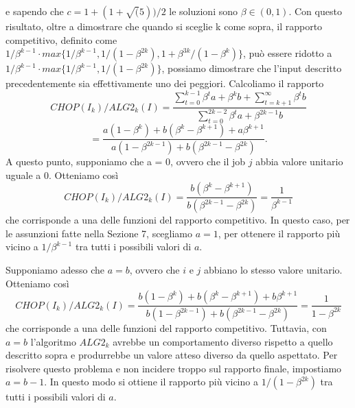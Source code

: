 \documentclass[twoside,openany,titlepage,fleqn,
	headinclude,12pt,a4paper,BCOR5mm,footinclude]{scrbook}
\begin{document}
e sapendo che $c=1 + (1 + \sqrt(5))/2$ le soluzioni sono $\beta \in (0,1)$. Con questo risultato, oltre a dimostrare che quando si sceglie k come sopra, il rapporto competitivo, definito come $1/\beta^{k-1} \cdot max \{1 / \beta^{k - 1}, 1 / (1 - \beta^{2k}), 1 + \beta^{3k} / (1 - \beta^{k})\}$, può essere ridotto a $1/\beta^{k-1} \cdot max \{1 / \beta^{k - 1}, 1 / (1 - \beta^{2k})\}$, possiamo dimostrare che l'input  descritto precedentemente sia effettivamente uno dei peggiori. Calcoliamo il rapporto $$CHOP(I_{k}) / ALG2_{k}(I) = \frac{ \sum_{t = 0}^{k-1}\beta^{t}a + \beta^{k} b + \sum_{t=k+1}^{\infty}\beta^{t}b}{\sum_{t=0}^{2k-2}\beta^{t}a + \beta^{2k-1}b}$$ $$= \frac{a(1 - \beta^{k}) + b(\beta^{k} - \beta^{k+1}) + a\beta^{k+1}}{a(1 - \beta^{2k-1}) + b(\beta^{2k-1}-\beta^{2k})}.$$
A questo punto, supponiamo che a = 0, ovvero che il job $j$ abbia valore unitario uguale a 0. Otteniamo così $$CHOP(I_{k}) / ALG2_{k}(I) = \frac{b(\beta^{k} - \beta^{k+1})}{b(\beta^{2k-1}-\beta^{2k})} = \frac{1}{\beta^{k-1}}$$ che corrisponde a una delle funzioni del rapporto competitivo. In questo caso, per le assunzioni fatte nella Sezione 7, scegliamo $a = 1$, per ottenere il rapporto più vicino a $1/\beta^{k-1}$ tra tutti i possibili valori di $a$.

Supponiamo adesso che $a = b$, ovvero che $i$ e $j$ abbiano lo stesso valore unitario. Otteniamo così $$CHOP(I_{k}) / ALG2_{k}(I) = \frac{b(1 - \beta^{k}) + b(\beta^{k} - \beta^{k+1}) + b\beta^{k+1}}{b(1 - \beta^{2k-1}) + b(\beta^{2k-1}-\beta^{2k})} = \frac{1}{1 - \beta^{2k}}$$ che corrisponde a una delle funzioni del rapporto competitivo. Tuttavia, con $a = b$ l'algoritmo $ALG2_{k}$ avrebbe un comportamento diverso rispetto a quello descritto sopra e produrrebbe un valore atteso diverso da quello aspettato. Per risolvere questo problema e non incidere troppo sul rapporto finale, impostiamo $a = b-1$. In questo modo si ottiene il rapporto più vicino a $1/(1 - \beta^{2k})$ tra tutti i possibili valori di $a$.
\end{document}
